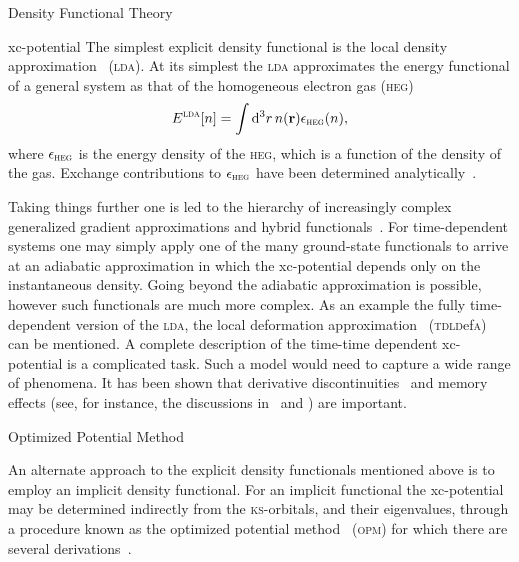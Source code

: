 \documentclass[a5paper, 9 pt]{extreport}
\begin{document}
\begin{chapter}{Density Functional Theory \label{chap:dft}}
\begin{section}{xc-potential \label{sec:xcpot}}
      The simplest explicit density functional is the local density approximation~\cite{ks-eq}
      (\textsc{lda}). At its simplest the \textsc{lda} approximates the energy functional of a general
      system as that of the homogeneous electron gas (\textsc{heg})
      \begin{equation} \label{eq:ldaE}
         E^\textsc{lda}[n] = \int \mathrm{d}^3 r \, n(\mathbf{r}) \epsilon_\textsc{heg}(n),
      \end{equation}
      where $\epsilon_\textsc{heg}$ is the energy density of the \textsc{heg}, which is a function of
      the density of the gas. Exchange contributions to $\epsilon_\textsc{heg}$ have been determined
      analytically~\cite{heg}.

      Taking things further one is led to the hierarchy of increasingly complex
      generalized gradient approximations and hybrid functionals~\cite{gga+}. For time-dependent systems
      one may simply apply one of the many ground-state functionals to arrive at an adiabatic
      approximation in which the xc-potential depends only on the instantaneous density. Going beyond
      the adiabatic approximation is possible, however such functionals are much more complex. As an
      example the fully time-dependent version of the \textsc{lda}, the local deformation
      approximation~\cite{TDLDefA1, TDLDefA2} (\textsc{tdld}ef\textsc{a}) can be mentioned. A complete
      description of the time-time dependent xc-potential is a complicated task. Such a model would need
      to capture a wide range of phenomena. It has been shown that derivative
      discontinuities~\cite{derDis} and memory effects (see, for instance, the discussions
      in~\cite{tddft} and \cite{ullrich}) are important.

      \begin{subsection}{Optimized Potential Method \label{sec:opm}}

         An alternate approach to the explicit density functionals mentioned above is to employ an
         implicit density functional. For an implicit functional the xc-potential may be determined
         indirectly from the \textsc{ks}-orbitals, and their eigenvalues, through a procedure known as
         the optimized potential method~\cite{opm1, opm2} (\textsc{opm}) for which there are several
         derivations~\cite{opm1, opm2, opm3, opm4, opm5, opm-rev}.


\end{subsection}
\end{section}
\end{chapter}
\end{document}
